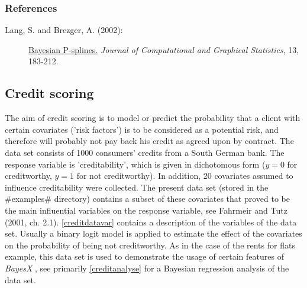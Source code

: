 \subsubsection*{References}

\begin{description}

\item[Lang, S. and Brezger, A. (2002):] \href{http://www.stat.uni-muenchen.de/~lang/publications.html}
{Bayesian P-splines.} {\it Journal of Computational and Graphical
Statistics}, 13, 183-212.

\end{description}


\subsection{Credit scoring}
\label{creditdata}  

The aim of credit scoring is to model or predict the probability
that a client with certain covariates ('risk factors') is to be
considered as a potential risk, and therefore will probably not
pay back his credit as agreed upon by contract. The data set
consists of 1000 consumers' credits from a South German bank. The
response variable is 'creditability', which is given in
dichotomous form ($y=0$ for creditworthy, $y=1$ for not
creditworthy). In addition, 20 covariates assumed to influence
creditability were collected. The present data set (stored in the
#examples# directory)  contains a subset of these covariates
that proved to be the main influential variables on the response
variable, see Fahrmeir and Tutz (2001, ch. 2.1). \autoref{creditdatavar}
contains a description of the variables of the data set. Usually a
binary logit model is applied to estimate the effect of the
covariates on the probability of being not creditworthy. As in the
case of the rents for flats example, this data set is used to
demonstrate the usage of certain features of {\em BayesX} , see
primarily \autoref{creditanalyse} for a Bayesian regression
analysis of the data set.

